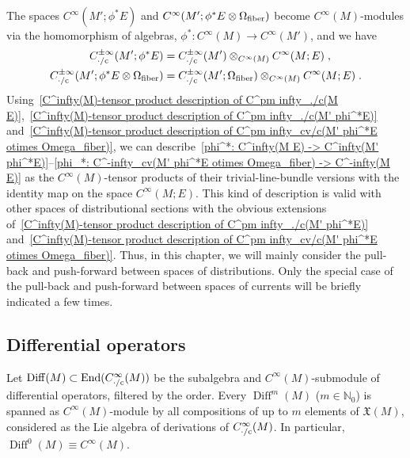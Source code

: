 \documentclass{memo-l}
\theoremstyle{plain}
\theoremstyle{definition}
\theoremstyle{remark}
\newcommand{\N}{\mathbb{N}}
\newcommand{\fX}{\mathfrak{X}}
\newcommand{\Diff}{\operatorname{Diff}}
\newcommand{\End}{\operatorname{End}}
\newcommand{\fiber}{{\text{\rm fiber}}}
\newcommand{\co}{{\text{\rm c}}}
\numberwithin{section}{chapter}
\numberwithin{equation}{section}%
\begin{document}
The spaces $C^\infty(M';\phi^*E)$ and $C^\infty(M';\phi^*E\otimes\Omega_\fiber)$ become $C^\infty(M)$-modules via the homomorphism of algebras, $\phi^*:C^\infty(M)\to C^\infty(M')$, and we have
\begin{align}
C^{\pm\infty}_{{\cdot}/\co}(M';\phi^*E)&=C^{\pm\infty}_{{\cdot}/\co}(M')\otimes_{C^\infty(M)}C^\infty(M;E)\;,
\label{C^infty(M)-tensor product description of C^pm infty_./c(M' phi^*E)}\\
C^{\pm\infty}_{{\cdot}/\co}(M';\phi^*E\otimes\Omega_\fiber)
&=C^{\pm\infty}_{{\cdot}/\co}(M';\Omega_\fiber)\otimes_{C^\infty(M)}C^\infty(M;E)\;.
\label{C^infty(M)-tensor product description of C^pm infty_cv/c(M' phi^*E otimes Omega_fiber)}
\end{align}
Using~\eqref{C^infty(M)-tensor product description of C^pm infty_./c(M E)},~\eqref{C^infty(M)-tensor product description of C^pm infty_./c(M' phi^*E)} and~\eqref{C^infty(M)-tensor product description of C^pm infty_cv/c(M' phi^*E otimes Omega_fiber)}, we can describe~\eqref{phi^*: C^infty(M E) -> C^infty(M' phi^*E)}--\eqref{phi_*: C^-infty_cv(M' phi^*E otimes Omega_fiber) -> C^-infty(M E)} as the $C^\infty(M)$-tensor products of their trivial-line-bundle versions with the identity map on the space $C^\infty(M;E)$. This kind of description is valid with other spaces of distributional sections with the obvious extensions of~\eqref{C^infty(M)-tensor product description of C^pm infty_./c(M' phi^*E)} and~\eqref{C^infty(M)-tensor product description of C^pm infty_cv/c(M' phi^*E otimes Omega_fiber)}. Thus, in this chapter, we will mainly consider the pull-back and push-forward between spaces of distributions. Only the special case of the pull-back and push-forward between spaces of currents will be briefly indicated a few times.



\subsection{Differential operators}\label{ss: diff ops}

Let $\Diff(M)\subset\End(C^\infty_{{\cdot}/\co}(M))$ be the subalgebra and $C^\infty(M)$-submodule of differential operators, filtered by the order. Every $\Diff^m(M)$ ($m\in\N_0$) is spanned as $C^\infty(M)$-module by all compositions of up to $m$ elements of $\fX(M)$, considered as the Lie algebra of derivations of $C^\infty_{{\cdot}/\co}(M)$. In particular, $\Diff^0(M)\equiv C^\infty(M)$.
\end{document}
